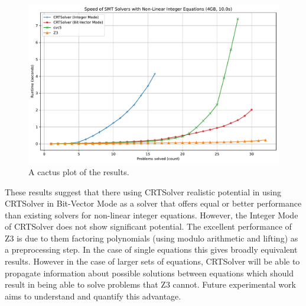 
\begin{figure}
    \vspace{4em}
    \centering
    \includegraphics[width=1.0\linewidth]{cactus.pdf}
  \caption{A cactus plot of the results.}
  \label{figure:cactus-plot}
\end{figure}

These results suggest that there using CRTSolver realistic potential in using CRTSolver in Bit-Vector Mode
as a solver that offers equal or better performance than existing solvers for non-linear
integer equations. However, the Integer Mode of CRTSolver does not
show significant potential.
%
The excellent performance of Z3 is due to them factoring polynomials
(using modulo arithmetic and lifting) as a preprocessing step.  In the
case of single equations this gives broadly equivalent results.
However in the case of larger sets of equations, CRTSolver will be
able to propagate information about possible solutions between
equations which should result in being able to solve problems that Z3
cannot.
%
Future experimental work aims to understand and quantify this
advantage.

